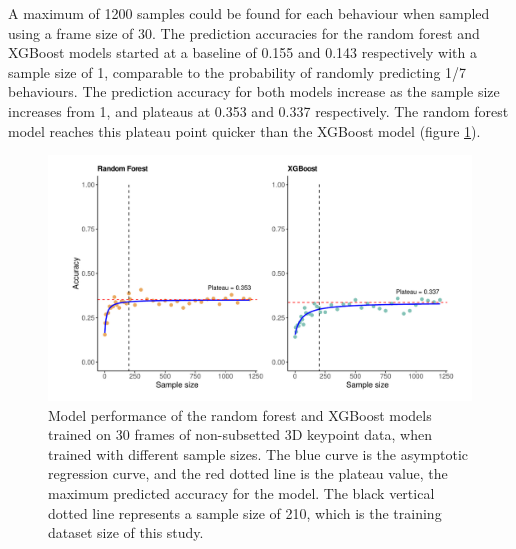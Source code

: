 \documentclass[11pt, letterpaper]{article} %
\begin{document}
    




    \noindent A maximum of 1200 samples could be found for each behaviour when sampled using a frame size of 30. The prediction accuracies for the random forest and XGBoost models started at a baseline of 0.155 and 0.143 respectively with a sample size of 1, comparable to the probability of randomly predicting 1/7 behaviours. The prediction accuracy for both models increase as the sample size increases from 1, and plateaus at 0.353 and 0.337 respectively. The random forest model reaches this plateau point quicker than the XGBoost model (figure \ref{fig:model_performance}).
    
    \begin{figure}[htbp]
        \centering
        \includegraphics[width=1\linewidth]{model_performance_plot.pdf}
        \caption{Model performance of the random forest and XGBoost models trained on 30 frames of non-subsetted 3D keypoint data, when trained with different sample sizes. The blue curve is the asymptotic regression curve, and the red dotted line is the plateau value, the maximum predicted accuracy for the model. The black vertical dotted line represents a sample size of 210, which is the training dataset size of this study.}
        \label{fig:model_performance}
    \end{figure}
\end{document}
